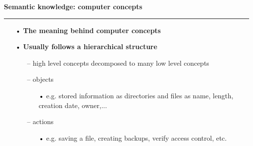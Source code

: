 \documentclass[pdf]{beamer}
\begin{document}
\begin{frame}
\vspace{8mm}
\textcolor{myBlue}{\textbf{\Large{Semantic knowledge: computer concepts}}}

\textcolor{red}{\rule{10cm}{1mm}}

\begin{small}

\begin{itemize}
\item[\textcolor{black}{•}] \textbf{The meaning behind computer concepts}

\item[\textcolor{black}{•}] \textbf{Usually follows a hierarchical structure}
    \begin{itemize}
    \item[\textcolor{black}{--}] high level concepts decomposed to many  low level concepts
    \item[\textcolor{black}{--}] objects
            \begin{itemize}
            \item[\textcolor{black}{•}] e.g. stored information as  directories and files as name,                      length, creation date, owner,...
            \end{itemize}
    \item[\textcolor{black}{--}] actions
            \begin{itemize}
            \item[\textcolor{black}{•}]e.g. saving a file, creating backups, verify access control, etc.
            \end{itemize}
    \end{itemize}
\end{itemize}
\end{small}
\end{frame}
\end{document}

